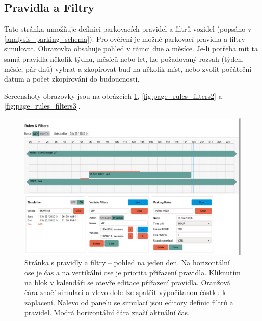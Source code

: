 \subsection{Pravidla a Filtry}

\noindent
Tato stránka umožňuje definici parkovacích pravidel a filtrů vozidel (popsáno v \ref{analysis_parking_schema}).
Pro ověření je možné parkovací pravidla a filtry simulovat.
Obrazovka obsahuje pohled v rámci dne a měsíce.
Je-li potřeba mít ta samá pravidla několik týdnů, měsíců nebo let, lze požadovaný rozsah (týden, měsíc, pár dnů) vybrat
a zkopírovat buď na několik míst, nebo zvolit počáteční datum a počet zkopírování do budoucnosti.

Screenshoty obrazovky jsou na obrázcích \ref{fig:page_rules_filters1}, \ref{fig:page_rules_filters2} a \ref{fig:page_rules_filters3}.

\begin{figure}[htb!] \centering
  \includegraphics[width=145mm]{../img/page_rules_filters1.png}
  \caption[Stránka s pravidly a filtry -- pohled na jeden den.]{Stránka s pravidly a filtry -- pohled na jeden den.
  Na horizontální ose je čas a na vertikální ose je priorita přiřazení pravidla.
  Kliknutím na blok v kalendáři se otevře editace přiřazení pravidla. Oranžová čára značí simulaci a vlevo
  dole lze spatřit výpočítanou částku k zaplacení. Nalevo od panelu se simulací jsou editory definic filtrů
  a pravidel. Modrá horizontální čára značí aktuální čas.}
  \label{fig:page_rules_filters1}
\end{figure}

